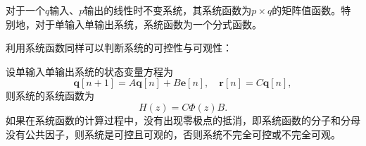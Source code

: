 对于一个$q$输入、$p$输出的线性时不变系统，其系统函数为$p\times q$的矩阵值函数。特别地，对于单输入单输出系统，系统函数为一个分式函数。

利用系统函数同样可以判断系统的可控性与可观性：

\begin{claim}
    设单输入单输出系统的状态变量方程为
    \begin{equation}
        \mathbf{q}[n+1]=A\mathbf{q}[n]+B\mathbf{e}[n],\quad \mathbf{r}[n]=C\mathbf{q}[n],
    \end{equation}
    则系统的系统函数为
    \begin{equation}
        H(z)=C\Phi(z)B.
    \end{equation}
    如果在系统函数的计算过程中，没有出现零极点的抵消，即系统函数的分子和分母没有公共因子，则系统是可控且可观的，否则系统不完全可控或不完全可观。
\end{claim}
